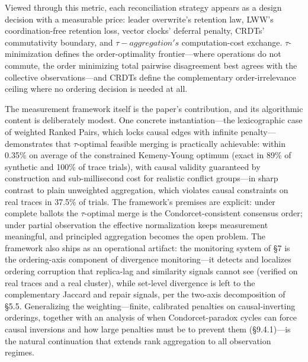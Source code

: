 \documentclass[journal]{IEEEtran}
\begin{document}
Viewed through this metric, each reconciliation strategy appears as a design decision with a measurable price: leader overwrite's retention law, LWW's coordination-free retention loss, vector clocks' deferral penalty, CRDTs' commutativity boundary, and $\tau-aggregation's$ computation-cost exchange. $\tau$-minimization defines the order-optimality frontier—where operations do not commute, the order minimizing total pairwise disagreement best agrees with the collective observations—and CRDTs define the complementary order-irrelevance ceiling where no ordering decision is needed at all.

The measurement framework itself is the paper's contribution, and its algorithmic content is deliberately modest. One concrete instantiation—the lexicographic case of weighted Ranked Pairs, which locks causal edges with infinite penalty—demonstrates that $\tau$-optimal feasible merging is practically achievable: within 0.35\% on average of the constrained Kemeny-Young optimum (exact in 89\% of synthetic and 100\% of trace trials), with causal validity guaranteed by construction and sub-millisecond cost for realistic conflict groups—in sharp contrast to plain unweighted aggregation, which violates causal constraints on real traces in 37.5\% of trials. The framework's premises are explicit: under complete ballots the $\tau$-optimal merge is the Condorcet-consistent consensus order; under partial observation the effective normalization keeps measurement meaningful, and principled aggregation becomes the open problem. The framework also ships as an operational artifact: the monitoring system of §7 is the ordering-axis component of divergence monitoring—it detects and localizes ordering corruption that replica-lag and similarity signals cannot see (verified on real traces and a real cluster), while set-level divergence is left to the complementary Jaccard and repair signals, per the two-axis decomposition of §5.5. Generalizing the weighting—finite, calibrated penalties on causal-inverting orderings, together with an analysis of when Condorcet-paradox cycles can force causal inversions and how large penalties must be to prevent them (§9.4.1)—is the natural continuation that extends rank aggregation to all observation regimes.
\end{document}
